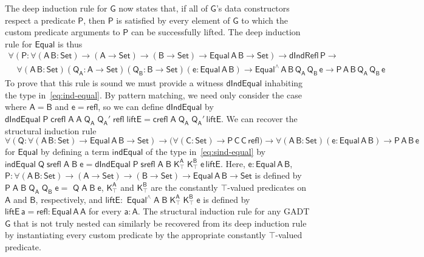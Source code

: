 \documentclass[9pt]{entcs}
\begin{document}
The deep induction rule for $\mathsf{G}$ now states that, if all of
$\mathsf{G}$'s data constructors respect a predicate $\mathsf{P}$,
then $\mathsf{P}$ is satisfied by every element of $\mathsf{G}$ to
which the custom predicate arguments to $\mathsf{P}$ can be
successfully lifted.  The deep induction rule for $\mathsf{Equal}$ is
thus
\begin{equation}\label{eq:ind-equal}
\begin{array}{l}
\mathsf{\forall (P : \forall (A\,B : Set) \to (A \to Set) \to (B \to
  Set) \to Equal\,A\,B \to Set) \to dIndRefl\,P \to}\\ \quad 
  \mathsf{\forall (A\,B : Set) (Q_A : A \to Set) (Q_B : B \to Set) (e:
  Equal\,A\,B) \to Equal^{\wedge}\,A\,B\,Q_A\,Q_B\,e \to
  P\,A\,B\,Q_A\,Q_B\,e}
\end{array}
\end{equation}
To prove that this rule is sound we must provide a witness
$\mathsf{dIndEqual}$ inhabiting the type in~\eqref{eq:ind-equal}.  By
pattern matching, we need only consider the case where $\mathsf{A} =
\mathsf{B}$ and $\mathsf{e} = \mathsf{refl}$, so we can define
$\mathsf{dIndEqual}$ by
$\mathsf{dIndEqual\;P\;crefl\;A\;A\;Q_A\;Q_A'\;refl\;liftE =
  crefl\;A\;Q_A\;Q_A'\,liftE}$. We can recover the structural
induction rule
\begin{equation}\label{eq:sind-equal}
\mathsf{\forall (Q : \forall (A\,B : Set)
  \to Equal\,A\,B \to Set) \to \big( \forall (C : Set) \to
  P\,C\,C\,refl \big) \to \forall (A\,B : Set) (e: Equal\,A\,B) \to
  P\,A\,B\,e}
\end{equation}
for $\mathsf{Equal}$ by defining a term $\mathsf{indEqual}$ of the
type in~\eqref{eq:sind-equal} by $\mathsf{indEqual\;Q\;srefl\;A\;B\;e
  = dIndEqual\;P\;srefl\;A\;B\;K^A_\top\;K^B_\top\;e\,liftE}$. Here,
$\mathsf{e : Equal\,A\,B}$, $\mathsf{P : \forall (A\,B : Set) \to (A
  \to Set) \to (B \to Set) \to Equal\,A\,B \to Set}$ is defined by
$\mathsf{P\;A\;B\;Q_A\;Q_B\;e =}$ $\mathsf{Q\;A\;B\;e}$,
$\mathsf{K^A_\top}$ and $\mathsf{K^B_\top}$ are the constantly
{\color{red} $\mathsf{\top}$}-valued predicates on $\mathsf{A}$ and
$\mathsf{B}$, respectively, and $\mathsf{liftE :}$
$\mathsf{Equal^{\wedge}\;A\;B\;K^A_\top\;K^B_\top\;e}$ is
defined
by $\mathsf{liftE\,a = refl : Equal\,A\,A}$ for every $\mathsf{a :
  A}$.  The structural induction rule for any GADT $\mathsf{G}$ that
is not truly nested can similarly be recovered from its deep induction
rule by instantiating every custom predicate by the appropriate
constantly {\color{red}$\mathsf{\top}$}-valued predicate.
\end{document}

